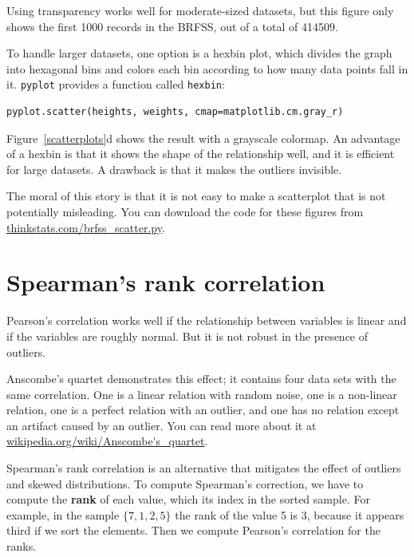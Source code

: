 \documentclass[12pt]{book}
\begin{document}
Using transparency works well for moderate-sized datasets, but this
figure only shows the first 1000 records in the BRFSS, out of a total
of 414509.


To handle larger datasets, one option is a hexbin plot, which divides
the graph into hexagonal bins and colors each bin according to how many
data points fall in it.  {\tt pyplot} provides a function called 
{\tt hexbin}:
%
\begin{verbatim}
pyplot.scatter(heights, weights, cmap=matplotlib.cm.gray_r)
\end{verbatim}
%
Figure~\ref{scatterplots}d shows the result with a grayscale colormap.
An advantage of a hexbin is that it shows the shape of the relationship
well, and it is efficient for large datasets.  A drawback is that
it makes the outliers invisible.


The moral of this story is that it is
not easy to make a scatterplot that is not potentially misleading.
You can download the code for these figures from
\url{thinkstats.com/brfss_scatter.py}.


\section{Spearman's rank correlation}

Pearson's correlation works well if the relationship between variables
is linear and if the variables are roughly normal.  But it is not
robust in the presence of outliers.



Anscombe's quartet demonstrates this effect; it contains four data
sets with the same correlation.  One is a linear relation with random
noise, one is a non-linear relation, one is a perfect relation with an
outlier, and one has no relation except an artifact caused by an
outlier.  You can read more about it at
\url{wikipedia.org/wiki/Anscombe's_quartet}.


Spearman's rank correlation is an alternative that mitigates the
effect of outliers and skewed distributions.  To compute Spearman's
correction, we have to compute the {\bf rank} of each value, which its
index in the sorted sample.  For example, in the sample $\{ 7, 1, 2, 5
\}$ the rank of the value 5 is 3, because it appears third if we sort
the elements.  Then we compute Pearson's correlation for the ranks.
\end{document}
